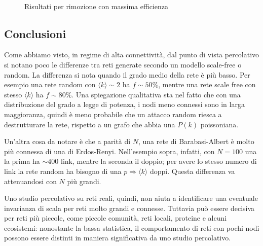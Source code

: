 \begin{figure}[p!]
	$\;$
	\caption[Risultati attacco.]{Risultati per rimozione con massima efficienza}
	\label{fig:atak}
\end{figure}

\subsection{Conclusioni}
Come abbiamo visto, in regime di alta connettività, dal punto di vista percolativo si notano poco le differenze tra reti generate secondo un modello scale-free o random. La differenza si nota quando il grado medio della rete è più basso. Per esempio una rete random con $\langle k \rangle \sim 2$ ha $f\sim 50\%$, mentre una rete scale free con stesso $\langle k \rangle$ ha $f\sim 80\%$. Una spiegazione qualitativa sta nel fatto che con una distribuzione del grado a legge di potenza, i nodi meno connessi sono in larga maggioranza, quindi è meno probabile che un attacco random riesca a destrutturare la rete, rispetto a un grafo che abbia una $P(k)$ poissoniana. 

Un'altra cosa da notare è che a parità di $N$, una rete di Barabasi-Albert è molto più connessa di una di Erdos-Renyi. Nell'esempio sopra, infatti, con $N=100$ una la prima ha $\sim400$ link, mentre la seconda il doppio; per avere lo stesso numero di link la rete random ha bisogno di una $p \Rightarrow \langle k \rangle$ doppi. Questa differenza va attenuandosi con $N$ più grandi.

Uno studio percolativo su reti reali, quindi, non aiuta a identificare una eventuale invarianza di scala per reti molto grandi e connesse. Tuttavia può essere decisiva per reti più piccole, come piccole comunità, reti locali, proteine e alcuni ecosistemi: nonostante la bassa statistica, il comportamento di reti con pochi nodi possono essere distinti in maniera significativa da uno studio percolativo.

